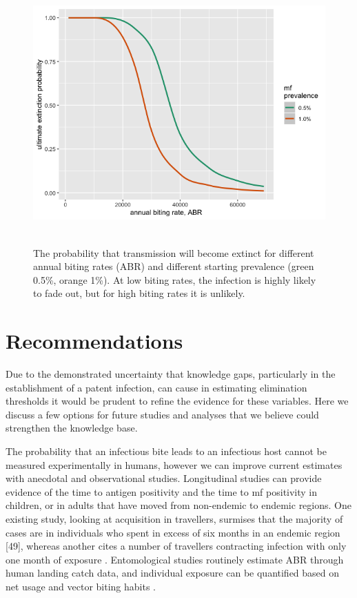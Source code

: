 \begin{figure}
    \centering
    \includegraphics[height=10cm]{Project/Figures/LFElimination/Figure5.png}
    \caption{The probability that transmission will become extinct for different annual biting rates (ABR) and different starting prevalence (green 0.5\%, orange 1\%).  At low biting rates, the infection is highly likely to fade out, but for high biting rates it is unlikely.}
    \label{fig:Elim_5}
\end{figure}

\section{Recommendations}

Due to the demonstrated uncertainty that knowledge gaps, particularly in the establishment of a patent infection, can cause in estimating elimination thresholds it would be prudent to refine the evidence for these variables. Here we discuss a few options for future studies and analyses that we believe could strengthen the knowledge base.

The probability that an infectious bite leads to an infectious host cannot be measured experimentally in humans, however we can improve current estimates with anecdotal and observational studies. Longitudinal studies can provide evidence of the time to antigen positivity and the time to mf positivity in children, or in adults that have moved from non-endemic to endemic regions. One existing study, looking at acquisition in travellers, surmises that the majority of cases are in individuals who spent in excess of six months in an endemic region [49], whereas another cites a number of travellers contracting infection with only one month of exposure \cite{Jones2014}. Entomological studies routinely estimate ABR through human landing catch data, and individual exposure can be quantified based on net usage and vector biting habits \cite{Reimer2013_insecticidal,Thomsen2017}.

